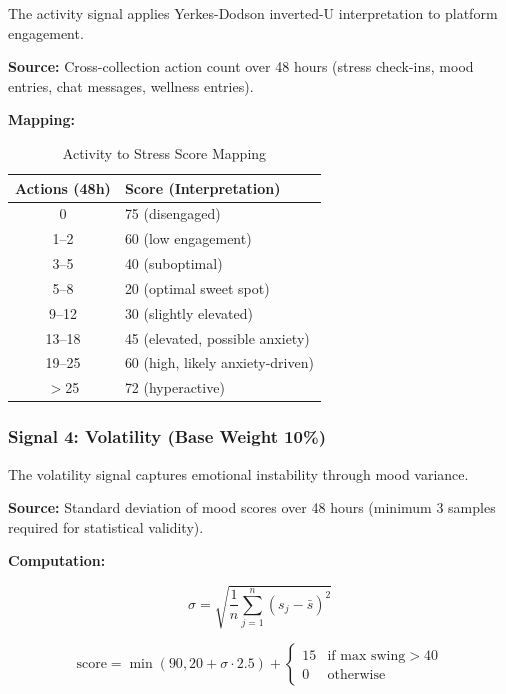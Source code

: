 \documentclass[journal]{IEEEtran}
\begin{document}
The activity signal applies Yerkes-Dodson inverted-U interpretation to platform engagement.

\textbf{Source:} Cross-collection action count over 48 hours (stress check-ins, mood entries, chat messages, wellness entries).

\textbf{Mapping:}

\begin{table}[htbp]
\caption{Activity to Stress Score Mapping}
\centering
\begin{tabular}{cl}
\toprule
\textbf{Actions (48h)} & \textbf{Score (Interpretation)} \\
\midrule
0 & 75 (disengaged) \\
1--2 & 60 (low engagement) \\
3--5 & 40 (suboptimal) \\
5--8 & 20 (optimal sweet spot) \\
9--12 & 30 (slightly elevated) \\
13--18 & 45 (elevated, possible anxiety) \\
19--25 & 60 (high, likely anxiety-driven) \\
$>$25 & 72 (hyperactive) \\
\bottomrule
\end{tabular}
\end{table}

\subsubsection{Signal 4: Volatility (Base Weight 10\%)}

The volatility signal captures emotional instability through mood variance.

\textbf{Source:} Standard deviation of mood scores over 48 hours (minimum 3 samples required for statistical validity).

\textbf{Computation:}

\begin{equation}
\sigma = \sqrt{\frac{1}{n}\sum_{j=1}^{n}(s_j - \bar{s})^2}
\end{equation}

\begin{equation}
\text{score} = \min(90, 20 + \sigma \cdot 2.5) + \begin{cases}
15 & \text{if max swing} > 40 \\
0 & \text{otherwise}
\end{cases}
\end{equation}
\end{document}
